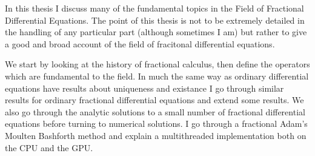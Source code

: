 In this thesis I discuss many of the fundamental topics in the Field of Fractional Differential Equations. The point of this thesis is not to be extremely detailed in the handling of any particular part (although sometimes I am) but rather to give a good and broad account of the field of fracitonal differential equations. 

We start by looking at the history of fractional calculus, then define the operators which are fundamental to the field. In much the same way as ordinary differential equations have results about uniqueness and existance I go through similar results for ordinary fractional differential equations and extend some results. We also go through the analytic solutions to a small number of fractional differential equations before turning to numerical solutions. I go through a fractional Adam's Moulten Bashforth method and explain a multithreaded implementation both on the CPU and the GPU. 
